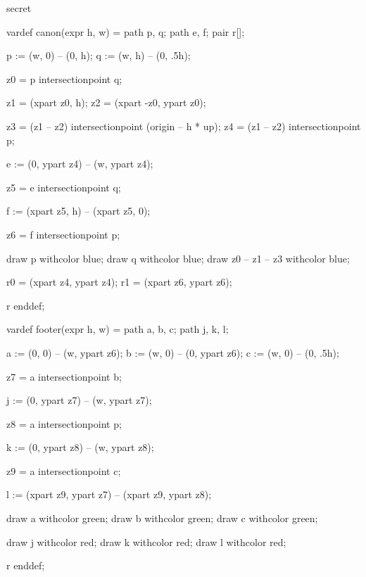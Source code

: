 %
%
%




\startenvironment secret

	\startMPdefinitions
		vardef canon(expr h, w) =
			path p, q;
			path e, f;
			pair r[];

			p := (w, 0) -- (0,   h);
			q := (w, h) -- (0, .5h);

			z0 = p intersectionpoint q; %

			z1 = (xpart  z0, h); %
			z2 = (xpart -z0, ypart z0); %

			z3 = (z1 -- z2) intersectionpoint (origin -- h * up); %
			z4 = (z1 -- z2) intersectionpoint p; %

			e := (0, ypart z4) -- (w, ypart z4);

			z5 = e intersectionpoint q; %

			f := (xpart z5, h) -- (xpart z5, 0);

			z6 = f intersectionpoint p; %

			draw p withcolor blue;
			draw q withcolor blue;
			draw z0 -- z1 -- z3 withcolor blue;

			r0 = (xpart z4, ypart z4); %
			r1 = (xpart z6, ypart z6); %

			r
		enddef;

		vardef footer(expr h, w) =
			path a, b, c;
			path j, k, l;

			a := (0, 0) -- (w, ypart z6);
			b := (w, 0) -- (0, ypart z6);
			c := (w, 0) -- (0, .5h);

			z7 = a intersectionpoint b; %

			j := (0, ypart z7) -- (w, ypart z7);

			z8 = a intersectionpoint p; %

			k := (0, ypart z8) -- (w, ypart z8);

			z9 = a intersectionpoint c; %

			l := (xpart z9, ypart z7) -- (xpart z9, ypart z8);

			draw a withcolor green;
			draw b withcolor green;
			draw c withcolor green;

			draw j withcolor red; %
			draw k withcolor red; %
			draw l withcolor red; %


			r
		enddef;
	\stopMPdefinitions

\stopenvironment

